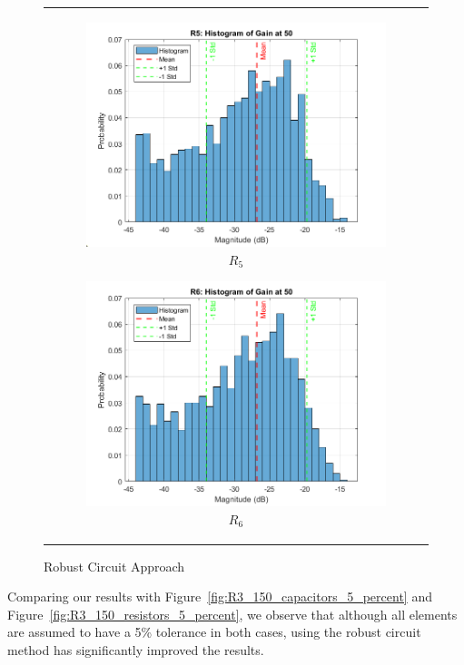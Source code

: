 \documentclass[hidelinks,12pt]{article}
\begin{document}
\begin{figure}[!h]
{\begin{tabular}{c}
				\begin{subfigure}[h]{0.4\textwidth}
					\centering
					\includegraphics[width=\textwidth]{figures/robust/r5.png}
					\caption{$R_5$}
				\end{subfigure}
				\hfill
				\begin{subfigure}[h]{0.4\textwidth}
					\centering
					\includegraphics[width=\textwidth]{figures/robust/r6.png}
					\caption{$R_6$}
				\end{subfigure}
			\end{tabular}
		}
		\caption{Robust Circuit Approach}
	\end{figure}
	
	Comparing our results with Figure~\ref{fig:R3_150_capacitors_5_percent} and Figure~\ref{fig:R3_150_resistors_5_percent}, we observe that although all elements are assumed to have a 5\% tolerance in both cases, using the robust circuit method has significantly improved the results.
	
\end{document}
